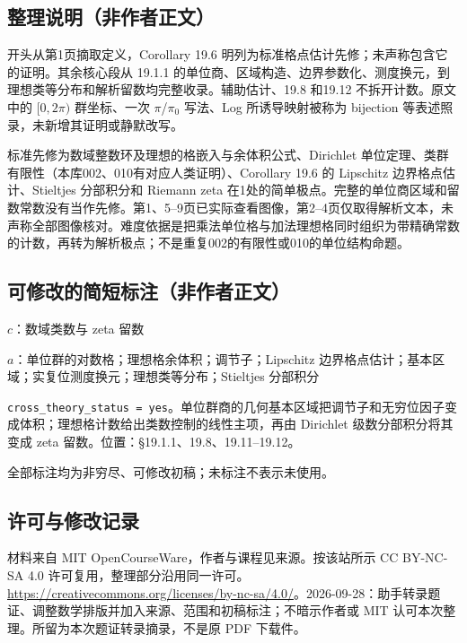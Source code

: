 \documentclass[UTF8,11pt]{ctexart}
\theoremstyle{definition}
\begin{document}
\subsection*{整理说明（非作者正文）}
开头从第1页摘取定义，Corollary 19.6 明列为标准格点估计先修；未声称包含它的证明。其余核心段从 19.1.1 的单位商、区域构造、边界参数化、测度换元，到理想类等分布和解析留数均完整收录。辅助估计、19.8 和19.12 不拆开计数。原文中的 $[0,2\pi)$ 群坐标、一次 $\pi$/$\pi_0$ 写法、Log 所诱导映射被称为 bijection 等表述照录，未新增其证明或静默改写。

标准先修为数域整数环及理想的格嵌入与余体积公式、Dirichlet 单位定理、类群有限性（本库002、010有对应人类证明）、Corollary 19.6 的 Lipschitz 边界格点估计、Stieltjes 分部积分和 Riemann zeta 在1处的简单极点。完整的单位商区域和留数常数没有当作先修。第1、5--9页已实际查看图像，第2--4页仅取得解析文本，未声称全部图像核对。难度依据是把乘法单位格与加法理想格同时组织为带精确常数的计数，再转为解析极点；不是重复002的有限性或010的单位结构命题。
\subsection*{可修改的简短标注（非作者正文）}
$c$：数域类数与 zeta 留数

$a$：单位群的对数格；理想格余体积；调节子；Lipschitz 边界格点估计；基本区域；实复位测度换元；理想类等分布；Stieltjes 分部积分

\texttt{cross\_theory\_status = yes}。单位群商的几何基本区域把调节子和无穷位因子变成体积；理想格计数给出类数控制的线性主项，再由 Dirichlet 级数分部积分将其变成 zeta 留数。位置：\S19.1.1、19.8、19.11--19.12。

全部标注均为非穷尽、可修改初稿；未标注不表示未使用。
\subsection*{许可与修改记录}
材料来自 MIT OpenCourseWare，作者与课程见来源。按该站所示 CC BY-NC-SA 4.0 许可复用，整理部分沿用同一许可。\url{https://creativecommons.org/licenses/by-nc-sa/4.0/}。2026-09-28：助手转录题证、调整数学排版并加入来源、范围和初稿标注；不暗示作者或 MIT 认可本次整理。所留为本次题证转录摘录，不是原 PDF 下载件。
\end{document}
